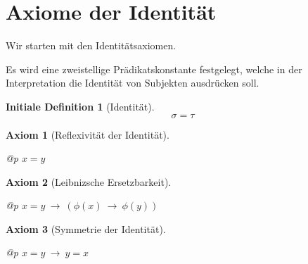 \documentclass[a4paper,german,10pt,twoside]{book}
\newtheorem{ax}{Axiom}
\theoremstyle{definition}
\newtheorem{idefn}[thm]{Initiale Definition}
\theoremstyle{remark}
\begin{document}
\section{Axiome der Identit{\"a}t} \label{chapter6_section0} \hypertarget{chapter6_section0}{}
Wir starten mit den Identit{\"a}tsaxiomen.

\par
Es wird eine zweistellige Pr{\"a}dikatskonstante festgelegt, welche in der Interpretation die Identit{\"a}t von Subjekten ausdr{\"u}cken soll.

\begin{idefn}[Identit{\"a}t]
\label{definition:identity} \hypertarget{definition:identity}{}
$$\sigma = \tau$$

\end{idefn}




\par


\begin{ax}[Reflexivit{\"a}t der Identit{\"a}t]
\label{axiom:identityIsReflexive} \hypertarget{axiom:identityIsReflexive}{}
\mbox{}
\begin{longtable}{{@{\extracolsep{\fill}}p{\linewidth}}}
\centering $x = y$
\end{longtable}

\end{ax}




\par


\begin{ax}[Leibnizsche Ersetzbarkeit]
\label{axiom:leibnizReplacement} \hypertarget{axiom:leibnizReplacement}{}
\mbox{}
\begin{longtable}{{@{\extracolsep{\fill}}p{\linewidth}}}
\centering $x = y\ \rightarrow \ (\phi(x)\ \rightarrow \ \phi(y))$
\end{longtable}

\end{ax}




\par


\begin{ax}[Symmetrie der Identit{\"a}t]
\label{axiom:symmetryOfIdentity} \hypertarget{axiom:symmetryOfIdentity}{}
\mbox{}
\begin{longtable}{{@{\extracolsep{\fill}}p{\linewidth}}}
\centering $x = y\ \rightarrow \ y = x$
\end{longtable}

\end{ax}
\end{document}
